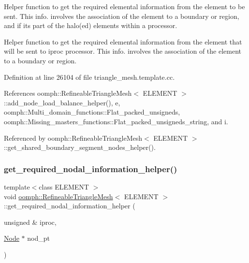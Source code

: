 Helper function to get the required elemental information from the element to be sent. This info. involves the association of the element to a boundary or region, and if its part of the halo(ed) elements within a processor. 

Helper function to get the required elemental information from the element that will be sent to iproc processor. This info. involves the association of the element to a boundary or region. 

Definition at line 26104 of file triangle\+\_\+mesh.\+template.\+cc.



References oomph\+::\+Refineable\+Triangle\+Mesh$<$ E\+L\+E\+M\+E\+N\+T $>$\+::add\+\_\+node\+\_\+load\+\_\+balance\+\_\+helper(), e, oomph\+::\+Multi\+\_\+domain\+\_\+functions\+::\+Flat\+\_\+packed\+\_\+unsigneds, oomph\+::\+Missing\+\_\+masters\+\_\+functions\+::\+Flat\+\_\+packed\+\_\+unsigneds\+\_\+string, and i.



Referenced by oomph\+::\+Refineable\+Triangle\+Mesh$<$ E\+L\+E\+M\+E\+N\+T $>$\+::get\+\_\+shared\+\_\+boundary\+\_\+segment\+\_\+nodes\+\_\+helper().

\mbox{\label{classoomph_1_1RefineableTriangleMesh_abfe2134892b2f845440947429d54539f}} 
\subsubsection{\texorpdfstring{get\+\_\+required\+\_\+nodal\+\_\+information\+\_\+helper()}{get\_required\_nodal\_information\_helper()}}
{\footnotesize\ttfamily template$<$class E\+L\+E\+M\+E\+NT $>$ \\
void \hyperlink{classoomph_1_1RefineableTriangleMesh}{oomph\+::\+Refineable\+Triangle\+Mesh}$<$ E\+L\+E\+M\+E\+NT $>$\+::get\+\_\+required\+\_\+nodal\+\_\+information\+\_\+helper (\begin{DoxyParamCaption}\item[{unsigned \&}]{iproc,  }\item[{\hyperlink{classoomph_1_1Node}{Node} $\ast$}]{nod\+\_\+pt }\end{DoxyParamCaption})\hspace{0.3cm}{\ttfamily [protected]}}



